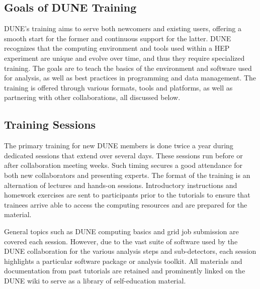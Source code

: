 \documentclass[../main-v1.tex]{subfiles}
\begin{document}

\subsection{Goals of DUNE Training}
DUNE’s training aims to serve both newcomers and existing users, offering a smooth start for the former and continuous support for the latter. %
DUNE recognizes that the computing environment and tools used within a HEP experiment are unique and evolve over time, and thus they require specialized training. The goals are to teach the basics of the environment and software used for analysis, as well as best practices in programming and data management. The training is offered through various formats, tools and platforms, as well as partnering with other collaborations, all discussed below. 



\subsection{Training Sessions}
The primary training for new DUNE members is done twice a year during  dedicated sessions that extend over several days. These sessions run before or after collaboration meeting weeks. Such timing secures a good attendance for both new collaborators and presenting experts.
The format of the training is an alternation of lectures and hands-on sessions. Introductory instructions and homework exercises are sent to participants prior to the tutorials to ensure that trainees 
arrive able to access the computing resources and are prepared for the material. %


General topics such as DUNE computing basics and grid job submission are covered each %
session. However, due to the vast suite of software used by the DUNE collaboration for the various analysis steps and sub-detectors, each %
session highlights a particular software package or analysis toolkit.  All materials and documentation from past tutorials are retained and prominently linked on the DUNE wiki to serve as a library of self-education material. %
\end{document}
